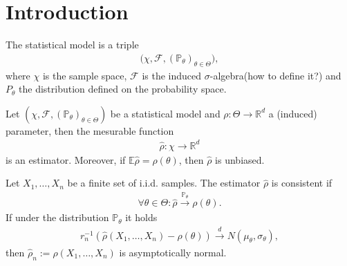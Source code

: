 \section{Introduction}
\begin{definition}
	The statistical model is a triple
	\begin{align*}
		\bigg(\chi, \mathcal{F}, (\mathbb{P}_\theta)_{\theta \in \Theta} \bigg),
	\end{align*}
	where $\chi$ is the sample space, $\mathcal{F}$ is the induced $\sigma$-algebra(how to define it?) and $P_\theta$ the distribution defined on the probability space. 
\end{definition}

\begin{definition} 
\end{definition}

\begin{definition}[estimator]
	Let $(\chi, \mathcal{F}, (\mathbb{P}_\theta)_{\theta \in \Theta})$ be a statistical model and $\rho: \Theta \rightarrow \mathbb{R}^d$ a (induced) parameter, then the mesurable function
	\begin{align*}
		\hat{\rho}: \chi \rightarrow \mathbb{R}^d
	\end{align*}
	is an estimator. Moreover, if $\mathbb{E} \hat{\rho} = \rho(\theta)$, then $\hat{\rho}$ is unbiased. 
\end{definition}

\begin{example}
	
\end{example}


\begin{definition}
	Let $X_1, \dots, X_n$ be a finite set of i.i.d. samples. The estimator $\hat{\rho}$ is consistent if 
	\begin{align*}
		\forall \theta \in \Theta: \hat{\rho} \overset{\mathbb{P}_\theta}{\longrightarrow} \rho(\theta).
	\end{align*}
	If under the distribution $\mathbb{P}_\theta$ it holds
	\begin{align*}
		r_n^{-1} (\hat{\rho}(X_1, \dots, X_n) - \rho(\theta)) \overset{d}{\longrightarrow} N(\mu_\theta, \sigma_\theta), 
	\end{align*}
	then $\hat{\rho}_n:= \hat{\rho}(X_1, \dots, X_n)$ is asymptotically normal. 
\end{definition}




